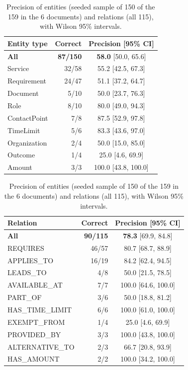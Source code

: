 \documentclass[11pt,a4paper]{article}
\begin{document}
\begin{table}[H]
\centering\small\setlength{\tabcolsep}{4pt}
\begin{minipage}[t]{0.47\textwidth}\centering
\begin{tabular}{lrc}
\toprule
Entity type & Correct & Precision [95\% CI] \\
\midrule
\textbf{All} & \textbf{87/150} & \textbf{58.0} [50.0, 65.6] \\
Service & 32/58 & 55.2 [42.5, 67.3] \\
Requirement & 24/47 & 51.1 [37.2, 64.7] \\
Document & 5/10 & 50.0 [23.7, 76.3] \\
Role & 8/10 & 80.0 [49.0, 94.3] \\
ContactPoint & 7/8 & 87.5 [52.9, 97.8] \\
TimeLimit & 5/6 & 83.3 [43.6, 97.0] \\
Organization & 2/4 & 50.0 [15.0, 85.0] \\
Outcome & 1/4 & 25.0 [4.6, 69.9] \\
Amount & 3/3 & 100.0 [43.8, 100.0] \\
\bottomrule
\end{tabular}
\end{minipage}\hfill
\begin{minipage}[t]{0.5\textwidth}\centering
\begin{tabular}{lrc}
\toprule
Relation & Correct & Precision [95\% CI] \\
\midrule
\textbf{All} & \textbf{90/115} & \textbf{78.3} [69.9, 84.8] \\
REQUIRES & 46/57 & 80.7 [68.7, 88.9] \\
APPLIES\_TO & 16/19 & 84.2 [62.4, 94.5] \\
LEADS\_TO & 4/8 & 50.0 [21.5, 78.5] \\
AVAILABLE\_AT & 7/7 & 100.0 [64.6, 100.0] \\
PART\_OF & 3/6 & 50.0 [18.8, 81.2] \\
HAS\_TIME\_LIMIT & 6/6 & 100.0 [61.0, 100.0] \\
EXEMPT\_FROM & 1/4 & 25.0 [4.6, 69.9] \\
PROVIDED\_BY & 3/3 & 100.0 [43.8, 100.0] \\
ALTERNATIVE\_TO & 2/3 & 66.7 [20.8, 93.9] \\
HAS\_AMOUNT & 2/2 & 100.0 [34.2, 100.0] \\
\bottomrule
\end{tabular}
\end{minipage}
\caption{Precision of entities (seeded sample of 150 of the 159 in the 6 documents) and relations (all 115),
with Wilson 95\% intervals.}
\label{tab:precision}
\end{table}
\end{document}
